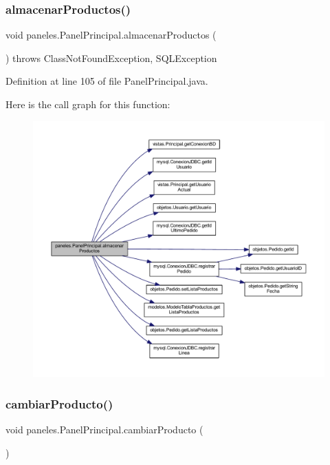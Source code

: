 \subsubsection{\texorpdfstring{almacenar\+Productos()}{almacenarProductos()}}
{\footnotesize\ttfamily void paneles.\+Panel\+Principal.\+almacenar\+Productos (\begin{DoxyParamCaption}{ }\end{DoxyParamCaption}) throws Class\+Not\+Found\+Exception, S\+Q\+L\+Exception}



Definition at line 105 of file Panel\+Principal.\+java.

Here is the call graph for this function\+:
\nopagebreak
\begin{figure}[H]
\begin{center}
\leavevmode
\includegraphics[width=350pt]{classpaneles_1_1_panel_principal_ad46c27384163d0757eadfe86cf72ee70_cgraph}
\end{center}
\end{figure}
\mbox{\label{classpaneles_1_1_panel_principal_aa2151461e479985277d05375c02b1022}} 
\subsubsection{\texorpdfstring{cambiar\+Producto()}{cambiarProducto()}}
{\footnotesize\ttfamily void paneles.\+Panel\+Principal.\+cambiar\+Producto (\begin{DoxyParamCaption}{ }\end{DoxyParamCaption})}



